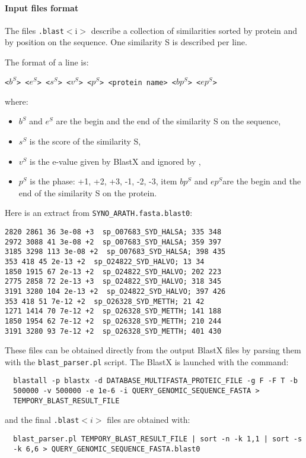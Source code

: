 \paragraph{Input files format}

The files \texttt{.blast}$<$i$>$ describe a collection of similarities
sorted by protein and by position on the sequence. One similarity S is
described per line.

The format of a line is:

\texttt{<$b^S$> <$e^S$> <$s^S$> <$v^S$> <$p^S$> <protein name> <$bp^S$> <$ep^S$>}

where:
\begin{itemize}
\item $b^S$ and $e^S$ are the begin and the end of the similarity S on the sequence,
\item $s^S$ is the score of the similarity S,
\item $v^S$ is the e-value given by BlastX and ignored by \EuGenie,
\item $p^S$ is the phase: +1, +2, +3, -1, -2, -3,
item $bp^S$ and $ep^S$are the begin and the end of the similarity S on the protein.
\end{itemize}

Here is an extract from \texttt{SYNO\_ARATH.fasta.blast0}:
\begin{Verbatim}[fontsize=\small]
2820 2861 36 3e-08 +3  sp_O07683_SYD_HALSA; 335 348
2972 3088 41 3e-08 +2  sp_O07683_SYD_HALSA; 359 397
3185 3298 113 3e-08 +2  sp_O07683_SYD_HALSA; 398 435
353 418 45 2e-13 +2  sp_O24822_SYD_HALVO; 13 34
1850 1915 67 2e-13 +2  sp_O24822_SYD_HALVO; 202 223
2775 2858 72 2e-13 +3  sp_O24822_SYD_HALVO; 318 345
3191 3280 104 2e-13 +2  sp_O24822_SYD_HALVO; 397 426
353 418 51 7e-12 +2  sp_O26328_SYD_METTH; 21 42
1271 1414 70 7e-12 +2  sp_O26328_SYD_METTH; 141 188
1850 1954 62 7e-12 +2  sp_O26328_SYD_METTH; 210 244
3191 3280 93 7e-12 +2  sp_O26328_SYD_METTH; 401 430
\end{Verbatim}
These files can be obtained directly from the output BlastX files by
parsing them with the \texttt{blast\_parser.pl} script.
The BlastX is launched with the command:
\begin{Verbatim}
  blastall -p blastx -d DATABASE_MULTIFASTA_PROTEIC_FILE -g F -F T -b
  500000 -v 500000 -e 1e-6 -i QUERY_GENOMIC_SEQUENCE_FASTA >
  TEMPORY_BLAST_RESULT_FILE
\end{Verbatim}
and the final \texttt{.blast}$<i>$ files are obtained with:
\begin{Verbatim}
  blast_parser.pl TEMPORY_BLAST_RESULT_FILE | sort -n -k 1,1 | sort -s
  -k 6,6 > QUERY_GENOMIC_SEQUENCE_FASTA.blast0
\end{Verbatim}

